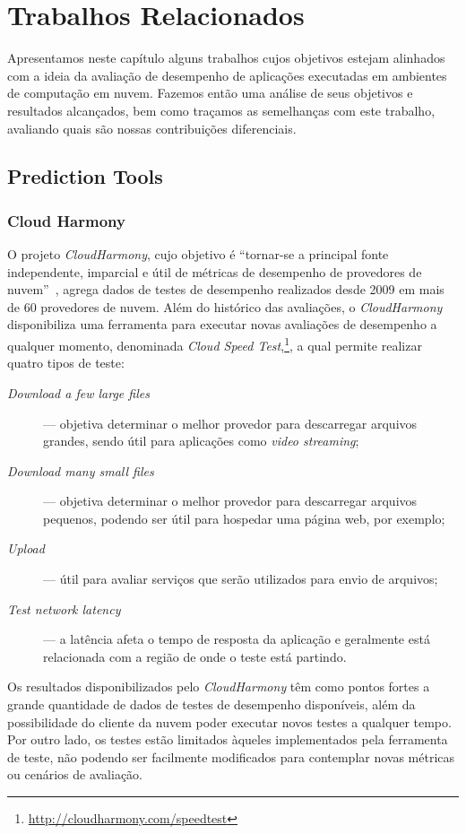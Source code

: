 \chapter[Trabalhos Relacionados]{Trabalhos Relacionados}
Apresentamos  neste capítulo alguns trabalhos cujos objetivos estejam alinhados 
com a ideia da avaliação de desempenho de aplicações executadas em ambientes de
computação em nuvem. Fazemos então uma análise de seus objetivos e resultados 
alcançados, bem como traçamos as semelhanças com este trabalho, avaliando quais são
nossas contribuições diferenciais.

\section{Prediction Tools}
\subsection{Cloud Harmony}
O projeto {\em CloudHarmony}, cujo
objetivo é ``tornar-se a principal fonte independente, imparcial e útil de
métricas de desempenho de provedores de nuvem''~\cite{cloudharmony}, agrega
dados de testes de desempenho realizados desde 2009 em mais de 60 provedores de
nuvem. Além do histórico das avaliações, o {\em CloudHarmony} disponibiliza uma ferramenta para executar novas avaliações de desempenho a qualquer momento, denominada
\textit{Cloud Speed Test},\footnote{\url{http://cloudharmony.com/speedtest}}, a qual permite realizar quatro tipos de teste:

\begin{description}
  \item[\em Download a few large files] --- objetiva determinar o melhor provedor
  para descarregar arquivos grandes, sendo útil para aplicações como {\em video
  streaming};
  \item[\em Download many small files] --- objetiva determinar o melhor provedor
  para descarregar arquivos pequenos, podendo ser útil para hospedar uma página
  web, por exemplo;
  \item[\em Upload] --- útil para avaliar serviços que serão utilizados para
  envio de arquivos;
  \item[\em Test network latency] --- a latência afeta o tempo de resposta da
  aplicação e geralmente está relacionada com a região de onde o teste está
  partindo.
\end{description}

Os resultados disponibilizados pelo {\em CloudHarmony} têm como pontos fortes a
grande quantidade de dados de testes de desempenho disponíveis, além da possibilidade do cliente da
nuvem poder executar novos testes a qualquer tempo. Por outro lado, os testes estão limitados àqueles implementados pela ferramenta de teste, não podendo ser facilmente modificados para contemplar novas métricas ou cenários de avaliação.

